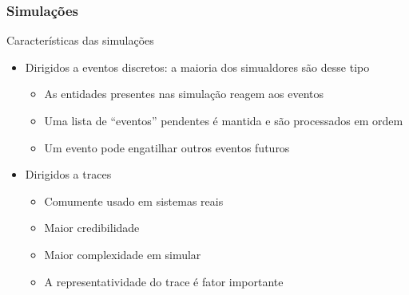 \documentclass{beamer}
\begin{document}
\begin{frame}\frametitle{Simulações}

\begin{block}{Características das simulações}
	\begin{itemize}
		\item Dirigidos a eventos discretos: a maioria dos simualdores são desse tipo
		\begin{itemize}
			\item As entidades presentes nas simulação reagem aos eventos
			\item Uma lista de ``eventos'' pendentes é mantida e são processados em ordem
			\item Um evento pode engatilhar outros eventos futuros
		\end{itemize}
		\item Dirigidos a traces
		\begin{itemize}
			\item Comumente usado em sistemas reais
			\item Maior credibilidade
			\item Maior complexidade em simular
			\item A representatividade do trace é fator importante
		\end{itemize}
	\end{itemize}
\end{block}

\end{frame}
\end{document}
